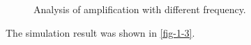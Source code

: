 \documentclass{article}
\begin{document}
\begin{figure}[htbp]
{		\label{fig-1-2-5}
	}
	\caption{Analysis of amplification with different frequency.}
	\label{fig-1-2}
\end{figure}

The simulation result was shown in \ref{fig-1-3}.
\end{document}
